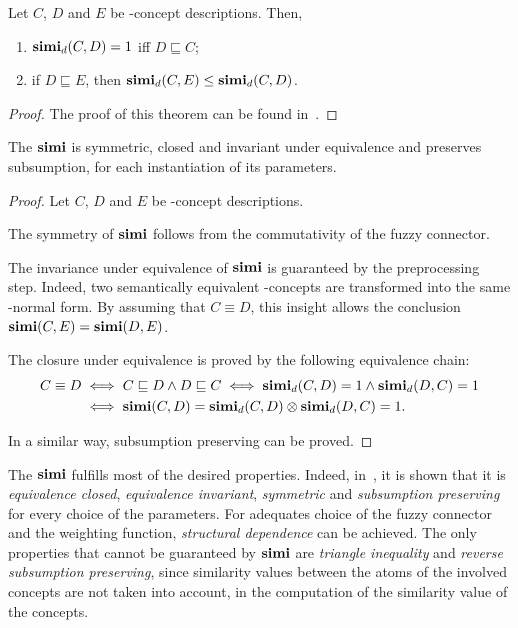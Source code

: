   \begin{lemma}
    Let \(C\), \(D\) and \(E\) be \elh-concept descriptions.
    Then,
    \begin{enumerate}
      \item \(\operatorname{\mathbf{simi}}_d(C,D) = 1\) iff \(D \sqsubseteq C\);
      \item if \(D \sqsubseteq E\), then \(\operatorname{\mathbf{simi}}_d(C,E) \le \operatorname{\mathbf{simi}}_d(C,D)\).
    \end{enumerate}
  \end{lemma}
  \begin{proof}
    The proof of this theorem can be found in~\cite{LeTu12}.
  \end{proof}
  \begin{theorem}
    The \csm \(\operatorname{\mathbf{simi}}\) is symmetric, closed and invariant under equivalence and preserves subsumption, for each instantiation of its parameters.
  \end{theorem}
  \begin{proof}
    Let \(C\), \(D\) and \(E\) be \elh-concept descriptions.

    The symmetry of \(\operatorname{\mathbf{simi}}\) follows from the commutativity of the fuzzy connector.

    The invariance under equivalence of \(\operatorname{\mathbf{simi}}\) is guaranteed by the preprocessing step.
    Indeed, two semantically equivalent \elh-concepts are transformed into the same \elh-normal form.
    By assuming that \(C \equiv D\), this insight allows the conclusion \(\operatorname{\mathbf{simi}}(C,E) = \operatorname{\mathbf{simi}}(D,E)\).

    The closure under equivalence is proved by the following equivalence chain:
    \begin{equation*}
      \begin{split}
        C \equiv D &\iff C \sqsubseteq D \land D \sqsubseteq C \iff
        \operatorname{\mathbf{simi}}_d(C,D) = 1 \land \operatorname{\mathbf{simi}}_d(D,C) = 1 \\ &\iff
        \operatorname{\mathbf{simi}}(C,D) = \operatorname{\mathbf{simi}}_d(C,D) \otimes \operatorname{\mathbf{simi}}_d(D,C) = 1.
      \end{split}
    \end{equation*}

    In a similar way, subsumption preserving can be proved.
  \end{proof}
  The \csm \(\operatorname{\mathbf{simi}}\) fulfills most of the desired properties.
  Indeed, in~\cite{LeTu12}, it is shown that it is \emph{equivalence closed}, \emph{equivalence invariant}, \emph{symmetric} and \emph{subsumption preserving} for every choice of the parameters.
  For adequates choice of the fuzzy connector and the weighting function, \emph{structural dependence} can be achieved.
  The only properties that cannot be guaranteed by \(\operatorname{\mathbf{simi}}\) are \emph{triangle inequality} and \emph{reverse subsumption preserving}, since similarity values between the atoms of the involved concepts are not taken into account, in the computation of the similarity value of the concepts.


